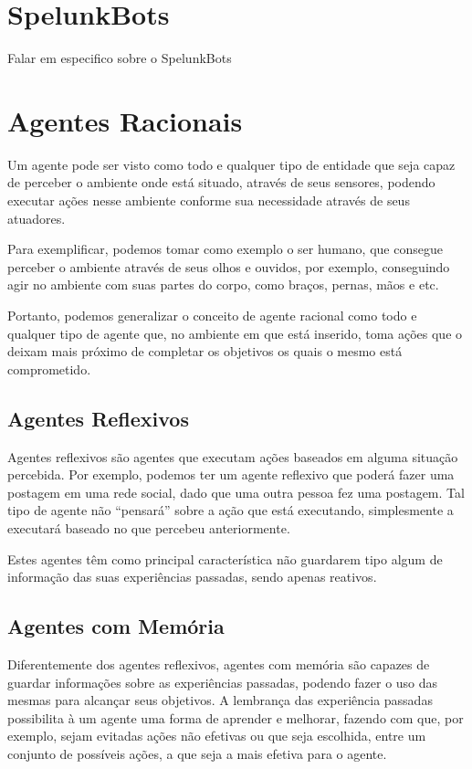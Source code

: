 \section{SpelunkBots}
Falar em especifico sobre o SpelunkBots



\section{Agentes Racionais}
Um agente pode ser visto como todo e qualquer tipo de entidade que seja capaz de
perceber o ambiente onde está situado, através de seus sensores, podendo
executar ações nesse ambiente conforme sua necessidade através de seus
atuadores.\cite{Russell:1995:AIM:193191}

Para exemplificar, podemos tomar como exemplo o ser humano, que consegue
perceber o ambiente através de seus olhos e ouvidos, por exemplo, conseguindo
agir no ambiente com suas partes do corpo, como braços, pernas, mãos e etc.
\cite{Russell:1995:AIM:193191}

Portanto, podemos generalizar o conceito de agente racional como todo e qualquer
tipo de agente que, no ambiente em que está inserido, toma ações que o deixam
mais próximo de completar os objetivos os quais o mesmo está comprometido.

\subsection{Agentes Reflexivos}
Agentes reflexivos são agentes que executam ações baseados em alguma situação
percebida. Por exemplo, podemos ter um agente reflexivo que poderá fazer uma
postagem em uma rede social, dado que uma outra pessoa fez uma postagem. Tal
tipo de agente não ``pensará'' sobre a ação que está executando, simplesmente a
executará baseado no que percebeu anteriormente.

Estes agentes têm como principal característica não guardarem tipo algum de
informação das suas experiências passadas, sendo apenas reativos.

\subsection{Agentes com Memória}
Diferentemente dos agentes reflexivos, agentes com memória são capazes de
guardar informações sobre as experiências passadas, podendo fazer o uso das
mesmas para alcançar seus objetivos. A lembrança das experiência passadas
possibilita à um agente uma forma de aprender e melhorar, fazendo com que, por
exemplo, sejam evitadas ações não efetivas ou que seja escolhida, entre um
conjunto de possíveis ações, a que seja a mais efetiva para o agente.

